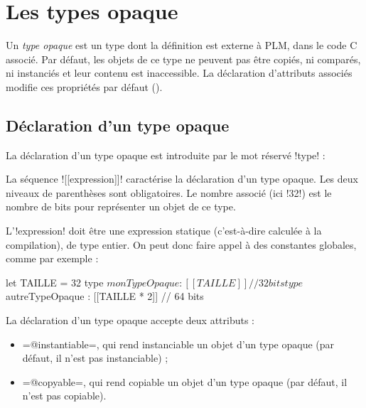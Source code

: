 




\chapter{Les types opaque}

Un \emph{type opaque} est un type dont la définition est externe à PLM, dans le code C associé. Par défaut, les objets de ce type ne peuvent pas être copiés, ni comparés, ni instanciés et leur contenu est inaccessible. La déclaration d'attributs associés modifie ces propriétés par défaut ().

\section{Déclaration d'un type opaque}

La déclaration d'un type opaque est introduite par le mot réservé \plm!type! :


La séquence \plm![[expression]]! caractérise la déclaration d'un type opaque. Les deux niveaux de parenthèses sont obligatoires. Le nombre associé (ici \plm!32!) est le nombre de bits pour représenter un objet de ce type.

L'\plm!expression! doit être une expression statique (c'est-à-dire calculée à la compilation), de type entier. On peut donc faire appel à des constantes globales, comme par exemple :

\begin{PLM}
let TAILLE = 32
type $monTypeOpaque : [[TAILLE]] // 32 bits
type $autreTypeOpaque : [[TAILLE * 2]] // 64 bits
\end{PLM}






La déclaration d'un type opaque accepte deux attributs :
\begin{itemize}
\item \plm=@instantiable=, qui rend instanciable un objet d'un type opaque (par défaut, il n'est pas instanciable) ;
\item \plm=@copyable=, qui rend copiable un objet d'un type opaque (par défaut, il n'est pas copiable).
\end{itemize}

